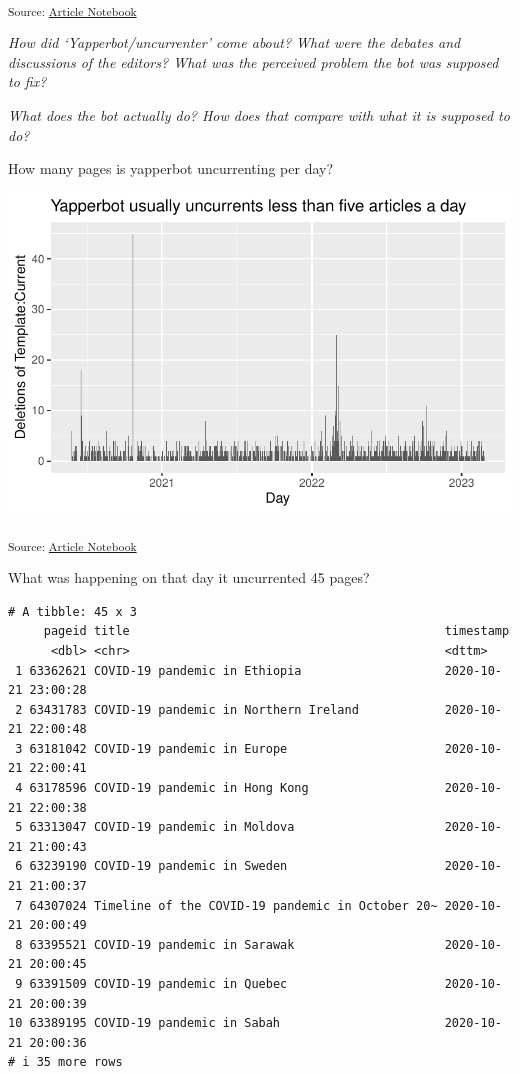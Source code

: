 \documentclass[
  Crown,
  times,
  sageh]{sagej}
\begin{document}
\textsubscript{Source:
\href{https://wikihistories.github.io/the-bot-that-makes-history/the-bot-that-makes-history.qmd.html}{Article
Notebook}}

\emph{How did `Yapperbot/uncurrenter' come about? What were the debates
and discussions of the editors? What was the perceived problem the bot
was supposed to fix?}

\emph{What does the bot actually do? How does that compare with what it
is supposed to do?}

How many pages is yapperbot uncurrenting per day?

\includegraphics[width=1\linewidth,height=\textheight,keepaspectratio]{the-bot-that-makes-history_files/figure-pdf/unnamed-chunk-3-1.pdf}

\textsubscript{Source:
\href{https://wikihistories.github.io/the-bot-that-makes-history/the-bot-that-makes-history.qmd.html}{Article
Notebook}}

What was happening on that day it uncurrented 45 pages?

\begin{verbatim}
# A tibble: 45 x 3
     pageid title                                            timestamp          
      <dbl> <chr>                                            <dttm>             
 1 63362621 COVID-19 pandemic in Ethiopia                    2020-10-21 23:00:28
 2 63431783 COVID-19 pandemic in Northern Ireland            2020-10-21 22:00:48
 3 63181042 COVID-19 pandemic in Europe                      2020-10-21 22:00:41
 4 63178596 COVID-19 pandemic in Hong Kong                   2020-10-21 22:00:38
 5 63313047 COVID-19 pandemic in Moldova                     2020-10-21 21:00:43
 6 63239190 COVID-19 pandemic in Sweden                      2020-10-21 21:00:37
 7 64307024 Timeline of the COVID-19 pandemic in October 20~ 2020-10-21 20:00:49
 8 63395521 COVID-19 pandemic in Sarawak                     2020-10-21 20:00:45
 9 63391509 COVID-19 pandemic in Quebec                      2020-10-21 20:00:39
10 63389195 COVID-19 pandemic in Sabah                       2020-10-21 20:00:36
# i 35 more rows
\end{verbatim}
\end{document}
